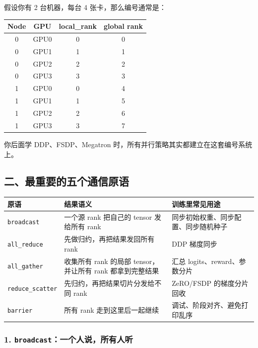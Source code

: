 假设你有 2 台机器，每台 4 张卡，那么编号通常是：

\begin{center}
{\small
\begin{tabular}{cccc}
\hline
\textbf{Node} & \textbf{GPU} & \textbf{local\_rank} & \textbf{global rank} \\
\hline
0 & GPU0 & 0 & 0 \\
0 & GPU1 & 1 & 1 \\
0 & GPU2 & 2 & 2 \\
0 & GPU3 & 3 & 3 \\
1 & GPU0 & 0 & 4 \\
1 & GPU1 & 1 & 5 \\
1 & GPU2 & 2 & 6 \\
1 & GPU3 & 3 & 7 \\
\hline
\end{tabular}
}
\end{center}

你后面学 DDP、FSDP、Megatron 时，所有并行策略其实都建立在这套编号系统上。

\subsection{二、最重要的五个通信原语}

\begin{center}
{\small
\begin{tabular}{p{3.1cm}p{4.1cm}p{5.1cm}}
\hline
\textbf{原语} & \textbf{结果语义} & \textbf{训练里常见用途} \\
\hline
\texttt{broadcast} & 一个源 rank 把自己的 tensor 发给所有 rank & 同步初始权重、同步配置、同步随机种子 \\
\texttt{all\_reduce} & 先做归约，再把结果发回所有 rank & DDP 梯度同步 \\
\texttt{all\_gather} & 收集所有 rank 的局部 tensor，并让所有 rank 都拿到完整结果 & 汇总 logits、reward、参数分片 \\
\texttt{reduce\_scatter} & 先归约，再把结果切片分发给不同 rank & ZeRO/FSDP 的梯度分片回收 \\
\texttt{barrier} & 所有 rank 走到这里后一起继续 & 调试、阶段对齐、避免打印乱序 \\
\hline
\end{tabular}
}
\end{center}

\subsubsection*{1. \texttt{broadcast}：一个人说，所有人听}

